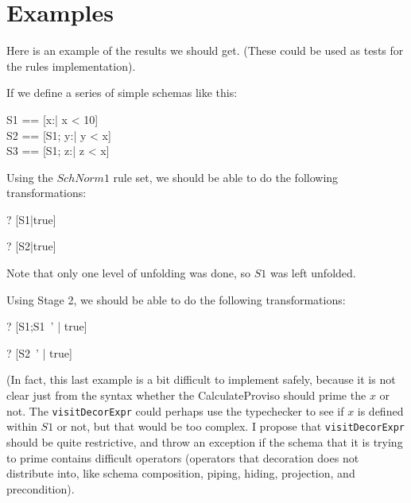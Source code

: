 \documentclass{article}
\begin{document}
\section*{Examples}
Here is an example of the results we should get.
(These could be used as tests for the rules implementation).

If we define a series of simple schemas like this:

\begin{zed}
  S1 == [x:\nat | x < 10] \\
  S2 == [S1; y:\nat | y < x] \\
  S3 == [S1; z:\nat | z < x]
\end{zed}

Using the $SchNorm1$ rule set, we should be able to
do the following transformations:

\begin{zed}
\vdash? [S1|true] 
\end{zed}
\begin{zed}
\vdash? [S2|true] 
\end{zed}

Note that only one level of unfolding was done, so $S1$ was left unfolded.

Using Stage 2, we should be able to
do the following transformations:

\begin{zed}
\vdash? [S1;S1~' | true] 
\end{zed}
\begin{zed}
\vdash? [S2~' | true] 
\end{zed}

(In fact, this last example is a bit difficult to implement safely,
because it is not clear just from the syntax whether the CalculateProviso
should prime the $x$ or not.  The \verb!visitDecorExpr! could perhaps
use the typechecker to see if $x$ is defined within $S1$ or not, but
that would be too complex.  I propose that \verb!visitDecorExpr! should
be quite restrictive, and throw an exception if the schema that it
is trying to prime contains difficult operators (operators that
decoration does not distribute into, like schema composition,
piping, hiding, projection, and precondition).
\end{document}
